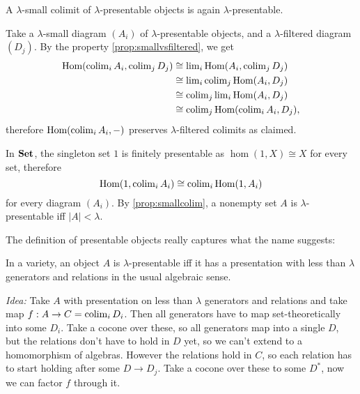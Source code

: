 \begin{Lemma}\label{prop:smallcolim} A $\lambda$-small colimit of $\lambda$-presentable objects is again $\lambda$-presentable.
\end{Lemma}
\begin{Proof}
Take a $\lambda$-small diagram $(A_i)$ of $\lambda$-presentable objects, and a $\lambda$-filtered diagram $(D_j)$. By the property \ref{prop:smallvsfiltered}, we get
\begin{align*}
\textrm{Hom}(\operatorname{colim}_i A_i, \operatorname{colim}_j D_j) &\cong \operatorname{lim}_i \textrm{Hom}(A_i, \operatorname{colim}_j D_j) \\
&\cong \operatorname{lim}_i \operatorname{colim}_j \textrm{Hom}(A_i, D_j) \\
&\cong \operatorname{colim}_j \operatorname{lim}_i \textrm{Hom}(A_i, D_j) \\
&\cong \operatorname{colim}_j \textrm{Hom}(\operatorname{colim}_i A_i, D_j),
\end{align*}
therefore $\textrm{Hom}(\operatorname{colim}_i A_i, -)$ preserves $\lambda$-filtered colimits as claimed.
\end{Proof}

\begin{Example}
In $\mathbf{Set}$, the singleton set $1$ is finitely presentable as $\hom(1,X) \cong X$ for every set, therefore
\[ \textrm{Hom}(1,\operatorname{colim}_i A_i) \cong \operatorname{colim}_i \textrm{Hom}(1,A_i) \]
for every diagram $(A_i)$. By \ref{prop:smallcolim}, a nonempty set $A$ is $\lambda$-presentable iff $|A| < \lambda$.
\end{Example}

The definition of presentable objects really captures what the name suggests: 

\begin{Proposition}\label{prop:varietypresentable} In a variety, an object $A$ is $\lambda$-presentable iff it has a presentation with less than $\lambda$ generators and relations in the usual algebraic sense.
\end{Proposition}
\textit{Idea: } Take $A$ with presentation on less than $\lambda$ generators and relations and take map $f : A \to C = \operatorname{colim}_i D_i$. Then all generators have to map set-theoretically into some $D_i$. Take a cocone over these, so all generators map into a single $D$, but the relations don't have to hold in $D$ yet, so we can't extend to a homomorphism of algebras. However the relations hold in $C$, so each relation has to start holding after some $D \to D_j$. Take a cocone over these to some $D^*$, now we can factor $f$ through it. \\

